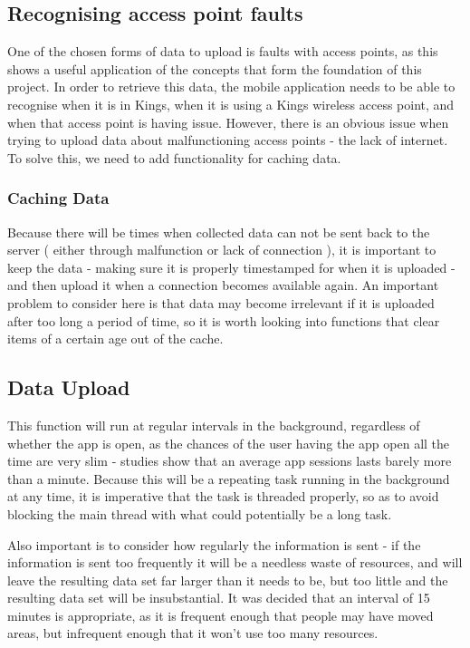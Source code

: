 \documentclass[11pt]{informatics-report}
\begin{document}
\subsection{Recognising access point faults}

One of the chosen forms of data to upload is faults with access points, as this shows a useful application of the concepts that form the foundation of this project. In order to retrieve this data, the mobile application needs to be able to recognise when it is in Kings, when it is using a Kings wireless access point, and when that access point is having issue. However, there is an obvious issue when trying to upload data about malfunctioning access points - the lack of internet. To solve this, we need to add functionality for caching data.

\subsubsection{Caching Data}

Because there will be times when collected data can not be sent back to the server ( either through malfunction or lack of connection ), it is important to keep the data - making sure it is properly timestamped for when it is uploaded - and then upload it when a connection becomes available again. An important problem to consider here is that data may become irrelevant if it is uploaded after too long a period of time, so it is worth looking into functions that clear items of a certain age out of the cache. 

\subsection{Data Upload}

This function will run at regular intervals in the background, regardless of whether the app is open, as the chances of the user having the app open all the time are very slim - studies show that an average app sessions lasts barely more than a minute\cite{Bohmer:2011:FAA:2037373.2037383}. Because this will be a repeating task running in the background at any time, it is imperative that the task is threaded properly, so as to avoid blocking the main thread with what could potentially be a long task. 

Also important is to consider how regularly the information is sent - if the information is sent too frequently it will be a needless waste of resources, and will leave the resulting data set far larger than it needs to be, but too little and the resulting data set will be insubstantial. It was decided that an interval of 15 minutes is appropriate, as it is frequent enough that people may have moved areas, but infrequent enough that it won't use too many resources.
\end{document}
